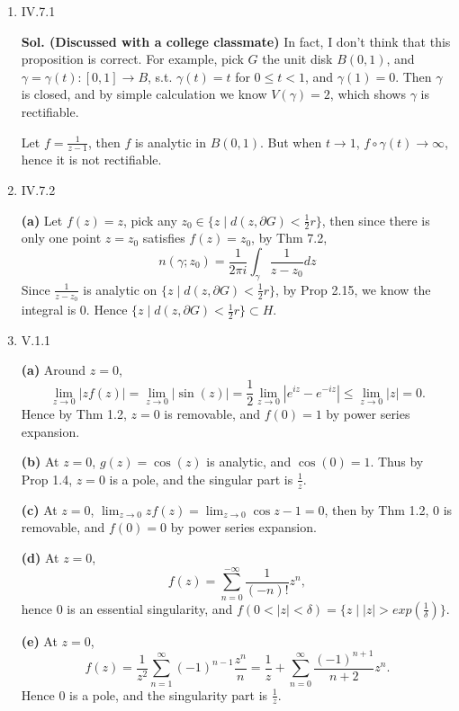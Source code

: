 \documentclass{article}%
\begin{document}
\begin{enumerate}


\item IV.7.1

\textbf{Sol. (Discussed with a college classmate)} In fact, I don't think that this proposition is correct. For example, pick $G$ the unit disk $B(0, 1)$, and $\gamma = \gamma(t): [0, 1] \to B$, s.t. $\gamma(t) = t$ for $0\le t < 1$, and $\gamma(1) = 0$. Then $\gamma$ is closed, and by simple calculation we know $V(\gamma) = 2$, which shows $\gamma$ is rectifiable.

Let $f = \frac{1}{z-1}$, then $f$ is analytic in $B(0, 1)$. But when $t \to 1$, $f\circ \gamma(t)\to\infty$, hence it is not rectifiable.

\item IV.7.2

\textbf{(a)} Let $f(z) = z$, pick any $z_0 \in \{z\mid d(z,\partial G) < \frac{1}{2}r\} $, then since there is only one point $z = z_0 $ satisfies $f(z) = z_0 $, by Thm 7.2,
$$
n(\gamma; z_0) = \frac{1}{2\pi i}\int_{\gamma}\frac{1}{z-z_0}dz
$$
Since $\frac{1}{z-z_0}$ is analytic on $\{z\mid d(z, \partial G) < \frac{1}{2}r\}$, by Prop 2.15, we know the integral is $0$. Hence $\{z\mid d(z,\partial G) < \frac{1}{2}r\} \subset H$.																

\item V.1.1

\textbf{(a)} Around $z = 0$,
$$
\lim_{z\to 0}|zf(z)| = \lim_{z\to 0}|\sin(z)| =\frac{1}{2}\lim_{z\to 0}|e^{iz}-e^{-iz}| \le \lim_{z\to 0}|z| = 0.
$$
Hence by Thm 1.2, $z = 0$ is removable, and $f(0) = 1$ by power series expansion.

\textbf{(b)} At $z = 0$, $g(z) = \cos(z)$ is analytic, and $\cos(0) = 1$. Thus by Prop 1.4, $z = 0$ is a pole, and the singular part is $\frac{1}{z}$.

\textbf{(c)} At $z = 0$, $\lim_{z \to 0} zf(z) = \lim_{z\to 0}\cos z-1 = 0 $, then by Thm 1.2, $0$ is removable, and $f(0) = 0$ by power series expansion.

\textbf{(d)} At $z = 0$, 
$$
f(z) = \sum_{n=0}^{-\infty}\frac{1}{(-n)!}z^{n} ,
$$
hence $0$ is an essential singularity, and $f(0<|z|<\delta) = \{z\mid |z| > exp(\frac{1}{\delta})\} $.

\textbf{(e)} At $z = 0$,
$$
f(z) = \frac{1}{z^2}\sum_{n=1}^{\infty}(-1)^{n-1}\frac{z^n}{n} = \frac{1}{z}+\sum_{n=0}^{\infty}\frac{(-1)^{n+1}}{n+2}z^n.
$$
Hence $0$ is a pole, and the singularity part is $\frac{1}{z}$.


\end{enumerate}
\end{document}
